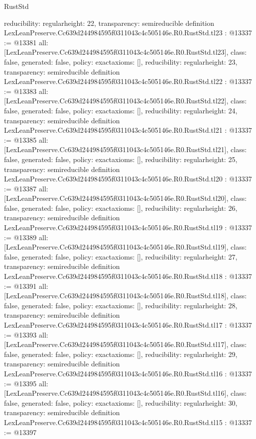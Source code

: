 \begin{lexlean}{RustStd}
\begin{coremodule}
{  reducibility: regular{height: 22},
  transparency: semireducible
}
definition LexLeanPreserve.Cc639d244984595f0311043c4c505146e.R0.RustStd.tl23 : @13337 := @13381 {
  all: [LexLeanPreserve.Cc639d244984595f0311043c4c505146e.R0.RustStd.tl23],
  class: false,
  generated: false,
  policy: exact{axioms: []},
  reducibility: regular{height: 23},
  transparency: semireducible
}
definition LexLeanPreserve.Cc639d244984595f0311043c4c505146e.R0.RustStd.tl22 : @13337 := @13383 {
  all: [LexLeanPreserve.Cc639d244984595f0311043c4c505146e.R0.RustStd.tl22],
  class: false,
  generated: false,
  policy: exact{axioms: []},
  reducibility: regular{height: 24},
  transparency: semireducible
}
definition LexLeanPreserve.Cc639d244984595f0311043c4c505146e.R0.RustStd.tl21 : @13337 := @13385 {
  all: [LexLeanPreserve.Cc639d244984595f0311043c4c505146e.R0.RustStd.tl21],
  class: false,
  generated: false,
  policy: exact{axioms: []},
  reducibility: regular{height: 25},
  transparency: semireducible
}
definition LexLeanPreserve.Cc639d244984595f0311043c4c505146e.R0.RustStd.tl20 : @13337 := @13387 {
  all: [LexLeanPreserve.Cc639d244984595f0311043c4c505146e.R0.RustStd.tl20],
  class: false,
  generated: false,
  policy: exact{axioms: []},
  reducibility: regular{height: 26},
  transparency: semireducible
}
definition LexLeanPreserve.Cc639d244984595f0311043c4c505146e.R0.RustStd.tl19 : @13337 := @13389 {
  all: [LexLeanPreserve.Cc639d244984595f0311043c4c505146e.R0.RustStd.tl19],
  class: false,
  generated: false,
  policy: exact{axioms: []},
  reducibility: regular{height: 27},
  transparency: semireducible
}
definition LexLeanPreserve.Cc639d244984595f0311043c4c505146e.R0.RustStd.tl18 : @13337 := @13391 {
  all: [LexLeanPreserve.Cc639d244984595f0311043c4c505146e.R0.RustStd.tl18],
  class: false,
  generated: false,
  policy: exact{axioms: []},
  reducibility: regular{height: 28},
  transparency: semireducible
}
definition LexLeanPreserve.Cc639d244984595f0311043c4c505146e.R0.RustStd.tl17 : @13337 := @13393 {
  all: [LexLeanPreserve.Cc639d244984595f0311043c4c505146e.R0.RustStd.tl17],
  class: false,
  generated: false,
  policy: exact{axioms: []},
  reducibility: regular{height: 29},
  transparency: semireducible
}
definition LexLeanPreserve.Cc639d244984595f0311043c4c505146e.R0.RustStd.tl16 : @13337 := @13395 {
  all: [LexLeanPreserve.Cc639d244984595f0311043c4c505146e.R0.RustStd.tl16],
  class: false,
  generated: false,
  policy: exact{axioms: []},
  reducibility: regular{height: 30},
  transparency: semireducible
}
definition LexLeanPreserve.Cc639d244984595f0311043c4c505146e.R0.RustStd.tl15 : @13337 := @13397 {
}
\end{coremodule}
\end{lexlean}
